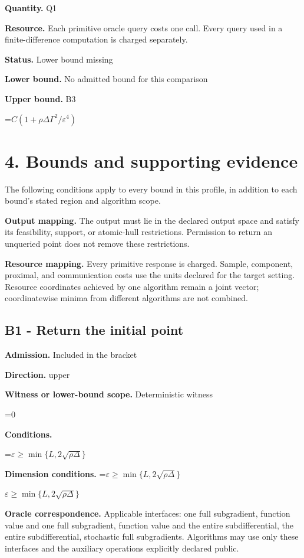 \documentclass[10pt,a4paper]{article}
\newcommand{\AtlasMath}[1]{\par\begingroup\centering\setbox0=\hbox{$\displaystyle #1$}\ifdim\wd0>1.4\linewidth\typeout{ATLAS WIDE FORMULA: \the\wd0}\fi\ifdim\wd0>\linewidth\resizebox{\linewidth}{!}{\box0}\else\box0\fi\par\endgroup}
\newcommand{\AtlasInlineMath}[1]{\begingroup\setbox0=\hbox{$#1$}\ifdim\wd0>.4\linewidth\endgroup\AtlasMath{#1}\else\endgroup$#1$\fi}
\begin{document}
\textbf{Quantity.} Q1

\textbf{Resource.} Each primitive oracle query costs one call. Every query used in a finite-difference computation is charged separately.

\textbf{Status.} Lower bound missing

\textbf{Lower bound.} No admitted bound for this comparison

\textbf{Upper bound.} B3

\AtlasMath{C(1+\rho\Delta\Gamma^2/\varepsilon^4)}
\section{4. Bounds and supporting evidence}
The following conditions apply to every bound in this profile, in addition to each bound's stated region and algorithm scope.

\textbf{Output mapping.} The output must lie in the declared output space and satisfy its feasibility, support, or atomic-hull restrictions. Permission to return an unqueried point does not remove these restrictions.

\textbf{Resource mapping.} Every primitive response is charged. Sample, component, proximal, and communication costs use the units declared for the target setting. Resource coordinates achieved by one algorithm remain a joint vector; coordinatewise minima from different algorithms are not combined.

\subsection{B1 - Return the initial point}
\textbf{Admission.} Included in the bracket

\textbf{Direction.} upper

\textbf{Witness or lower-bound scope.} Deterministic witness

\AtlasMath{0}
\textbf{Conditions.} 
\AtlasMath{\varepsilon\ge\min\{L,2\sqrt{\rho\Delta}\}}


\textbf{Dimension conditions.} \AtlasInlineMath{\varepsilon\ge\min\{L,2\sqrt{\rho\Delta}\}}

\textbf{Oracle correspondence.} Applicable interfaces: one full subgradient, function value and one full subgradient, function value and the entire subdifferential, the entire subdifferential, stochastic full subgradients. Algorithms may use only these interfaces and the auxiliary operations explicitly declared public.
\end{document}
